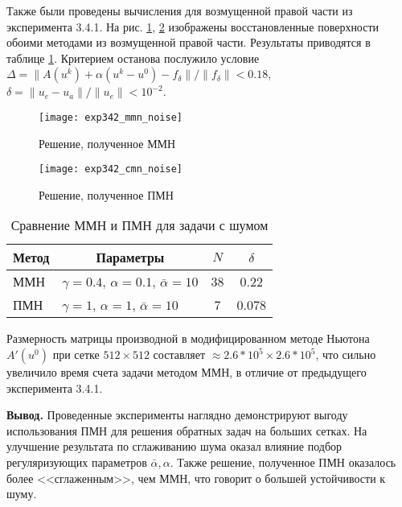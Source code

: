 Также были проведены вычисления для возмущенной правой части из эксперимента 3.4.1. На рис. \ref{fig:exp342_mmn_noise}, \ref{fig:exp342_cmn_noise} изображены восстановленные поверхности обоими методами из возмущенной правой части. Результаты приводятся в таблице \ref{table3.6}. Критерием останова послужило условие $\Delta=\|A(u^k)+\alpha(u^k-u^0)-f_\delta\|/\|f_\delta\|<0.18$, $\delta=\|u_e-u_a\|/\|u_e\|<10^{-2}$.
\begin{figure}[H]
	\centering
	\texttt{[image: exp342\_mmn\_noise]}
	\caption{Решение, полученное ММН}
	\label{fig:exp342_mmn_noise}
\end{figure}
\begin{figure}[H]
	\centering
	\texttt{[image: exp342\_cmn\_noise]}
	\caption{Решение, полученное ПМН}
	\label{fig:exp342_cmn_noise}
\end{figure}
\begin{table}[h]
	\centering
	\renewcommand{\arraystretch}{1.5}
	\caption{Сравнение ММН и ПМН для задачи с шумом}
	\label{table3.6}
	\begin{tabular}{|l|l|c|c|}
		\hline
		\multicolumn{1}{|c|}{Метод} & \multicolumn{1}{c|}{Параметры}              & $N$ & $\delta$ \\ \hline
		ММН                         & $\gamma =0.4$, $\alpha=0.1$, $\bar\alpha=10$ & 38   & 0.22     \\ \hline
		ПМН                         & $\gamma =1$, $\alpha=1$, $\bar\alpha=10$    & 7   & 0.078    \\ \hline
	\end{tabular}
\end{table}

Размерность матрицы производной в модифицированном методе Ньютона $A'(u^0)$ при сетке $512\times512$ составляет $\approx 2.6 * 10^5\times 2.6 * 10^5$, что сильно увеличило время счета задачи методом ММН, в отличие от предыдущего эксперимента 3.4.1. 

{\bfseries\large Вывод.} Проведенные эксперименты наглядно демонстрируют выгоду использования ПМН для решения обратных задач на больших сетках. На улучшение результата по сглаживанию шума оказал влияние подбор регуляризующих параметров $\bar{\alpha}, \alpha$. Также решение, полученное ПМН оказалось более <<сглаженным>>, чем ММН, что говорит о большей устойчивости к шуму.
 
